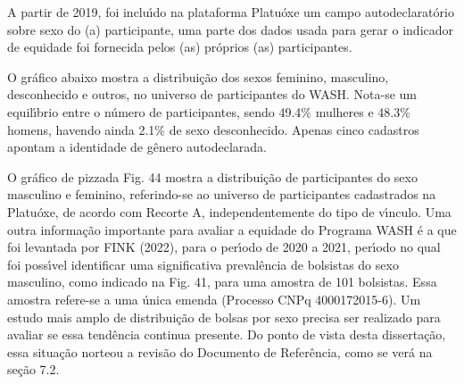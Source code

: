 \documentclass[
12pt,		%
openright,	%
twoside,  %
a4paper,			%
chapter=TITLE,		%
english,			%
french,				%
spanish,			%
brazil				%
]{USPSC-classe/USPSC}
\begin{document}
A partir de 2019, foi inclu\'{\i}do na plataforma Platu\'oxe um campo autodeclarat\'orio sobre sexo do (a) participante, uma parte dos dados usada para gerar o indicador de equidade foi fornecida pelos (as) pr\'oprios (as) participantes.

















O gr\'afico abaixo mostra a distribui\c{c}\~ao dos sexos feminino, masculino,  desconhecido e outros, no universo de participantes do WASH. Nota-se um equil\'{\i}brio entre o n\'umero de participantes, sendo 49.4\%  mulheres e 48.3\% homens, havendo ainda 2.1\% de sexo desconhecido. Apenas cinco cadastros apontam a identidade de g\^enero autodeclarada.

















O gr\'afico de \textquotedbl pizza\textquotedbl  da Fig. 44 mostra a distribui\c{c}\~ao de participantes do sexo masculino e feminino, referindo-se ao universo de participantes cadastrados na Platu\'oxe, de acordo com Recorte A, independentemente do tipo de v\'{\i}nculo. Uma outra informa\c{c}\~ao importante para avaliar a equidade do Programa  WASH \'e a que foi levantada por  FINK (2022), para o per\'{\i}odo de 2020 a 2021, per\'{\i}odo no qual foi poss\'{\i}vel identificar uma significativa preval\^encia de bolsistas do sexo masculino, como indicado na Fig. 41, para uma amostra de 101 bolsistas. Essa amostra refere-se a uma \'unica emenda (Processo CNPq 4000172015-6). Um estudo mais amplo de distribui\c{c}\~ao de bolsas por sexo precisa ser realizado para avaliar se essa tend\^encia continua presente. Do ponto de vista desta disserta\c{c}\~ao, essa situa\c{c}\~ao norteou a revis\~ao do Documento de Refer\^encia, como se ver\'a na se\c{c}\~ao 7.2.
\end{document}
